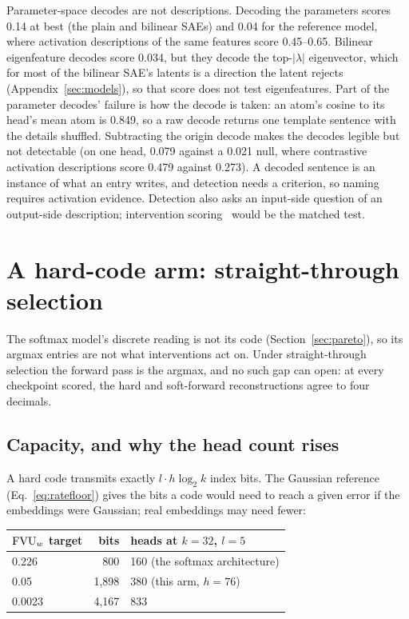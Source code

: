 Parameter-space decodes are not descriptions. Decoding the parameters
scores 0.14 at best (the plain and bilinear SAEs) and 0.04 for the
reference model, where activation descriptions of the same features
score 0.45--0.65. Bilinear eigenfeature decodes score 0.034, but they
decode the top-$|\lambda|$ eigenvector, which for most of the bilinear
SAE's latents is a direction the latent rejects (Appendix~\ref{sec:models}),
so that score does not test eigenfeatures. Part of the parameter decodes'
failure is how the decode is taken: an atom's cosine to its head's mean atom is
0.849, so a raw decode returns one template sentence with the details
shuffled. Subtracting the origin decode makes the decodes legible but not
detectable (on one head, 0.079 against a 0.021 null, where contrastive
activation descriptions score 0.479 against 0.273). A decoded sentence is
an instance of what an entry writes, and detection needs a criterion, so
naming requires activation evidence. Detection also asks an input-side
question of an output-side description; intervention
scoring~\cite{paulo2025} would be the matched test.

\section{A hard-code arm: straight-through selection}
\label{sec:ste}

The softmax model's discrete reading is not its code
(Section~\ref{sec:pareto}), so its argmax entries are not what
interventions act on. Under straight-through selection the forward pass
is the argmax, and no such gap can open: at every checkpoint scored, the
hard and soft-forward reconstructions agree to four decimals.

\subsection{Capacity, and why the head count rises}

A hard code transmits exactly $l\cdot h\log_2 k$ index bits. The Gaussian
reference (Eq.~\eqref{eq:ratefloor}) gives the bits a code would need
to reach a given error if the embeddings were Gaussian; real embeddings
may need fewer:

\begin{center}\small
\begin{tabular}{@{}lrl@{}}
\toprule
$\mathrm{FVU}_w$ target & bits & heads at $k{=}32$, $l{=}5$ \\
\midrule
0.226 & 800 & 160 (the softmax architecture) \\
0.05 & 1{,}898 & 380 (this arm, $h{=}76$) \\
0.0023 & 4{,}167 & 833 \\
\bottomrule
\end{tabular}
\end{center}

